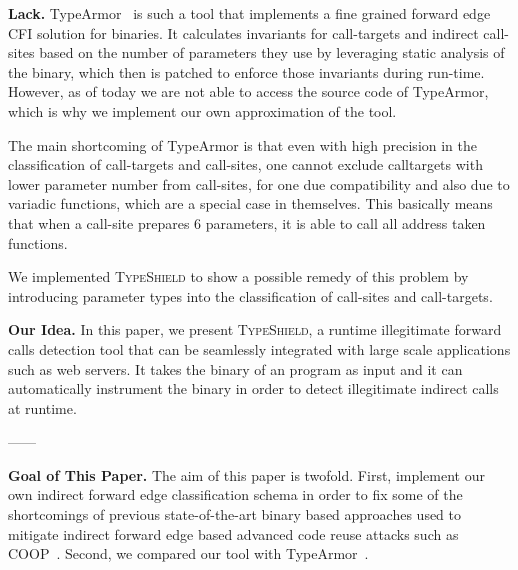 \textbf{Lack.} TypeArmor~\cite{veen:typearmor} is such a tool that implements a fine grained forward edge CFI 
solution for binaries. It calculates invariants for call-targets and indirect call-sites based on
the number of parameters they use by leveraging static analysis of the binary, which then is
patched to enforce those invariants during run-time. However, as of today we are not able to 
access the source code of TypeArmor, which is why we implement our own approximation of the 
tool.

The main shortcoming of TypeArmor is that even with high precision in the classification of 
call-targets and call-sites, one cannot exclude calltargets with lower parameter number from 
call-sites, for one due compatibility and also due to variadic functions, which are a special
case in themselves. This basically means that when a call-site prepares 6 parameters, it is 
able to call all address taken functions.

We implemented \textsc{TypeShield} to show a possible remedy of this problem by introducing
parameter types into the classification of call-sites and call-targets. 

\textbf{Our Idea.} In this paper, we present \textsc{TypeShield}, a runtime illegitimate forward 
calls detection tool that can be seamlessly integrated with large scale applications such as web servers.
It takes the binary of an program as input and it can automatically instrument the binary in order
to detect illegitimate indirect calls at runtime.

------


\textbf{Goal of This Paper.} The aim of this paper is twofold. First, implement our own indirect forward edge 
classification schema in order to fix some of the shortcomings of previous state-of-the-art binary based approaches
used to mitigate indirect forward edge based advanced code reuse attacks such as COOP~\cite{schuster:coop}.
Second, we compared our tool with TypeArmor~\cite{veen:typearmor}.

